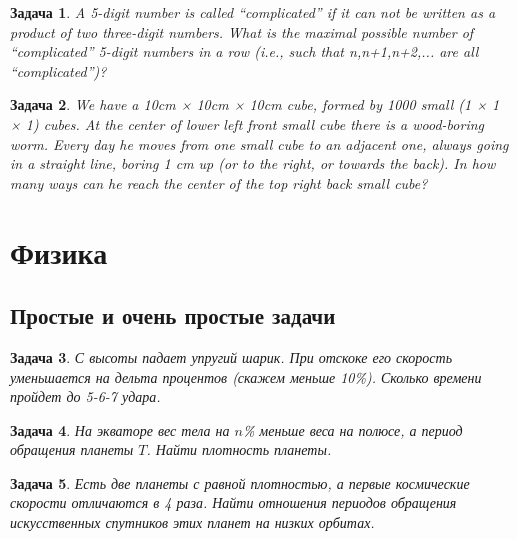 \documentclass[12pt]{article}
\theoremstyle{break}
\newtheorem{problem}{Задача}[subsection]
\begin{document}
\begin{problem}
A 5-digit number is called “complicated” if it can not be written as a product of two three-digit numbers. What is the maximal possible number of “complicated” 5-digit numbers in a row (i.e., such that n,n+1,n+2,... are all “complicated”)?
\end{problem}


\begin{problem}
We have a 10cm × 10cm × 10cm cube, formed by 1000 small (1 × 1 × 1) cubes. At the center of lower left front small cube there is a wood-boring worm. Every day he moves from one small cube to an adjacent one, always going in a straight line, boring 1 cm up (or to the right, or towards the back). In how many ways can he reach the center of the top right back small cube?
\end{problem}




\section{Физика}

\subsection{Простые и очень простые задачи}



\begin{problem}
С высоты падает упругий шарик. При отскоке его скорость уменьшается на дельта процентов (скажем меньше 10\%). Сколько времени пройдет до 5-6-7 удара.
\end{problem}


\begin{problem}
На экваторе вес тела на $n$\% меньше веса на полюсе, а период обращения планеты $T$. Найти плотность планеты.
\end{problem}


\begin{problem}
Есть две планеты с равной плотностью, а первые космические скорости отличаются в 4 раза.
Найти отношения периодов обращения искусственных спутников этих планет на низких орбитах.
\end{problem}
\end{document}
